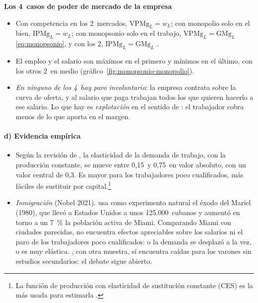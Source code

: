 \documentclass[11pt]{article}
\begin{document}
\begin{anotaciones}
\textbf{Los 4~casos de poder de mercado de la empresa}

\begin{itemize}
\item Con competencia en los 2~mercados, $\mathrm{VPMg}_L=w_L$; con monopolio solo en el bien, $\mathrm{IPMg}_L=w_L$; con monopsonio solo en el trabajo, $\mathrm{VPMg}_L=\mathrm{GMg}_L$ \eqref{eq:monopsonio}, y con los 2, $\mathrm{IPMg}_L=\mathrm{GMg}_L$ .
\item El empleo y el salario son máximos en el primero y mínimos en el último, con los otros 2~en medio (gráfico~\ref{fig:monopsonio-monopolio}).
\item \emph{En ninguno de los 4~hay paro involuntario}: la empresa contrata sobre la curva de oferta, y al salario que paga trabajan todos los que quieren hacerlo a ese salario. Lo que hay es \emph{explotación} en el sentido de \textcite{Robinson1933Economics}: el trabajador cobra menos de lo que aporta en el margen.
\end{itemize}

\begin{figuracaja}
\caption{Empresa con monopsonio en el trabajo y monopolio en el bien: menos empleo y menos salario, sin paro involuntario}\label{fig:monopsonio-monopolio}
\end{figuracaja}
\end{anotaciones}

\paragraph{d) Evidencia empírica}\label{sec:demanda-evidencia}

\begin{itemize}
\item Según la revisión de \textcite{Hamermesh1993Labor}, la elasticidad de la demanda de trabajo, con la producción constante, se mueve entre 0{,}15~y 0{,}75~en valor absoluto, con un valor central de 0{,}3. Es mayor para los trabajadores poco cualificados, más fáciles de sustituir por capital.\footnote{La función de producción con elasticidad de sustitución constante (CES) es la más usada para estimarla .}
\item \emph{Inmigración} (Nobel 2021). \textcite{Card1990Impact} usa como experimento natural el éxodo del Mariel (1980), que llevó a Estados Unidos a unos 125.000~cubanos y aumentó en torno a un 7~\% la población activa de Miami. Comparando Miami con ciudades parecidas, no encuentra efectos apreciables sobre los salarios ni el paro de los trabajadores poco cualificados: o la demanda se desplazó a la vez, o es muy elástica. \textcite{Borjas2017Wage}, con otra muestra, sí encuentra caídas para los varones sin estudios secundarios: el debate sigue abierto.
\end{itemize}
\end{document}
